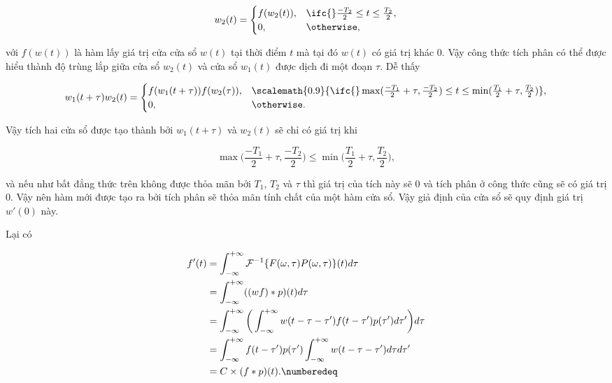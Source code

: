 			\begin{equation}
				w_2(t) = \begin{cases}
					f(w_2(t)),		& \ifc{} \frac{-T_2}{2} \le t \le \frac{T_2}{2}, \\
					0,				& \otherwise,
				\end{cases}
			\end{equation}
		
		\noindent với $f(w(t))$ là hàm lấy giá trị cửa cửa sổ $w(t)$ tại thời điểm $t$ mà tại đó $w(t)$ có giá trị khác $0$. Vậy công thức tích phân  có thể được hiểu thành độ trùng lắp giữa cửa sổ $w_2(t)$ và cửa sổ $w_1(t)$ được dịch đi một đoạn $\tau$. Dễ thấy
		
			\begin{equation}
				w_1(t + \tau) w_2(t) = \begin{cases}
					f(w_1(t + \tau)) f(w_2(\tau)),	& \scalemath{0.9}{\ifc{} \max(\frac{-T_1}{2} + \tau, \frac{-T_2}{2}) \le t \le \min(\frac{T_1}{2} + \tau, \frac{T_2}{2})}, \\
					0,								& \otherwise.
				\end{cases}
			\label{ola::modified_spectrogram_multiply_w}
			\end{equation}
		
		Vậy tích hai cửa sổ được tạo thành bởi $w_1(t + \tau)$ và $w_2(t)$ sẽ chỉ có giá trị khi
		
			\begin{equation}
				\max \bigg( \frac{-T_1}{2} + \tau, \frac{-T_2}{2} \bigg) \le \min \bigg( \frac{T_1}{2} + \tau, \frac{T_2}{2} \bigg),
			\end{equation}
			
		\noindent và nếu như bất đẳng thức trên không được thỏa mãn bởi $T_1$, $T_2$ và $\tau$ thì giá trị của tích này sẽ $0$ và tích phân ở công thức  cũng sẽ có giá trị $0$. Vậy nên hàm mới được tạo ra bởi tích phân  sẽ thỏa mãn tính chất của một hàm cửa sổ. Vậy giả định của cửa sổ sẽ quy định giá trị $w'(0)$ này. 
		
		Lại có
		
			\begin{align*}
				f'(t) 	& = \int_{-\infty}^{+\infty} \mathcal{F}^{-1}\{F(\omega, \tau) P(\omega, \tau)\}(t) d\tau \\
				& = \int_{-\infty}^{+\infty} ((wf) \ast p)(t) d\tau \\
				& = \int_{-\infty}^{+\infty} \bigg( \int_{-\infty}^{+\infty} w(t - \tau - \tau') f(t - \tau') p(\tau') d\tau' \bigg) d\tau \\
				& = \int_{-\infty}^{+\infty} f(t - \tau') p(\tau') \int_{-\infty}^{+\infty} w(t - \tau - \tau') d\tau d\tau' \\ %
				& = C \times (f \ast p)(t). \numberedeq
			\end{align*}
		
